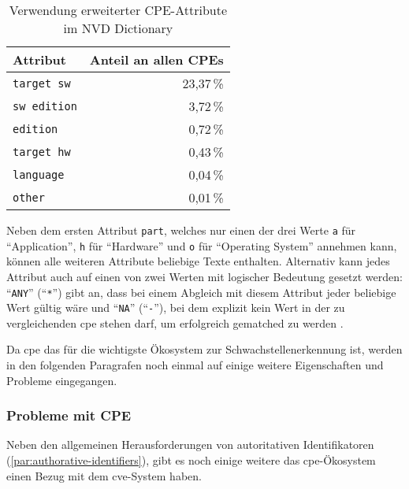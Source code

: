 \begin{table}[h]
    \centering
    \begin{tabular}{lr}
        \toprule
        \textbf{Attribut}   & \textbf{Anteil an allen CPEs} \\
        \midrule
        \texttt{target sw}  & 23{,}37\,\%                   \\
        \texttt{sw edition} & 3{,}72\,\%                    \\
        \texttt{edition}    & 0{,}72\,\%                    \\
        \texttt{target hw}  & 0{,}43\,\%                    \\
        \texttt{language}   & 0{,}04\,\%                    \\
        \texttt{other}      & 0{,}01\,\%                    \\
        \bottomrule
    \end{tabular}
    \caption{Verwendung erweiterter CPE-Attribute im NVD Dictionary}
    \label{tab:cpe-attribute-verteilung}
\end{table}

Neben dem ersten Attribut \texttt{part}, welches nur einen der drei Werte \texttt{a} für \enquote{Application}, \texttt{h} für \enquote{Hardware} und \texttt{o} für \enquote{Operating System} annehmen kann, können alle weiteren Attribute beliebige Texte enthalten.
Alternativ kann jedes Attribut auch auf einen von zwei Werten mit logischer Bedeutung gesetzt werden:
\enquote{\texttt{ANY}} (\enquote{\texttt{*}}) gibt an, dass bei einem Abgleich mit diesem Attribut jeder beliebige Wert gültig wäre und \enquote{\texttt{NA}} (\enquote{\texttt{-}}), bei dem explizit kein Wert in der zu vergleichenden \acrshort{cpe} stehen darf, um erfolgreich gematched zu werden \autocite{Parmelee_Booth_Waltermire_Scarfone_2011}.

Da \acrshort{cpe} das für die \metaeffektsp wichtigste Ökosystem zur Schwachstellenerkennung ist, werden in den folgenden Paragrafen noch einmal auf einige weitere Eigenschaften und Probleme eingegangen.

\subsubsection{Probleme mit CPE}

Neben den allgemeinen Herausforderungen von autoritativen Identifikatoren (\autoref{par:authorative-identifiers}), gibt es noch einige weitere das \acrshort{cpe}-Ökosystem einen Bezug mit dem \acrshort{cve}-System haben.

